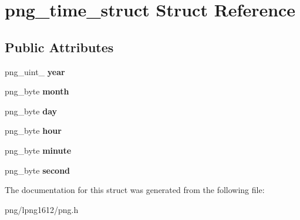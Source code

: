\hypertarget{structpng__time__struct}{\section{png\+\_\+time\+\_\+struct Struct Reference}
\label{structpng__time__struct}
}
\subsection*{Public Attributes}
\begin{DoxyCompactItemize}
\item 
\hypertarget{structpng__time__struct_a5cceb6213fc7b4462435ea1d8fc1c798}{png\+\_\+uint\+\_ {\bfseries year}}\label{structpng__time__struct_a5cceb6213fc7b4462435ea1d8fc1c798}

\item 
\hypertarget{structpng__time__struct_a3ab550977ee2cb1165c0398131f2e601}{png\+\_\+byte {\bfseries month}}\label{structpng__time__struct_a3ab550977ee2cb1165c0398131f2e601}

\item 
\hypertarget{structpng__time__struct_afa0f94516a676178d1dabeb96eccdcdb}{png\+\_\+byte {\bfseries day}}\label{structpng__time__struct_afa0f94516a676178d1dabeb96eccdcdb}

\item 
\hypertarget{structpng__time__struct_a79ac8b217254fd87cdc7299e6612a6f4}{png\+\_\+byte {\bfseries hour}}\label{structpng__time__struct_a79ac8b217254fd87cdc7299e6612a6f4}

\item 
\hypertarget{structpng__time__struct_ad3ce11e9d92b77a33b3f7480bf0fff8c}{png\+\_\+byte {\bfseries minute}}\label{structpng__time__struct_ad3ce11e9d92b77a33b3f7480bf0fff8c}

\item 
\hypertarget{structpng__time__struct_a84e528e4c4c7d76cd2252e0d0d2ed0c9}{png\+\_\+byte {\bfseries second}}\label{structpng__time__struct_a84e528e4c4c7d76cd2252e0d0d2ed0c9}

\end{DoxyCompactItemize}


The documentation for this struct was generated from the following file\+:\begin{DoxyCompactItemize}
\item 
png/lpng1612/png.\+h\end{DoxyCompactItemize}
